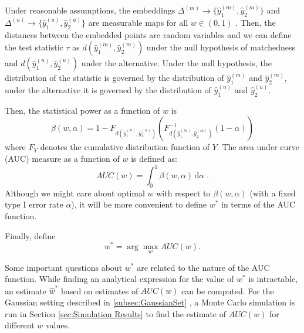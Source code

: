 \documentclass[12pt]{article} %
\begin{document}
 Under reasonable assumptions, the embeddings $\Delta^{(m)} \rightarrow  \{\hat{y}_{1}^{(m)},\hat{y}_{2}^{(m)}\!\}$  and $\Delta^{(u)}\rightarrow \{\hat{y}_{1}^{(u)} , \hat{y}_{2}^{(u)}\}$ are measurable maps for all $w \in (0,1)$ \cite{measurable_Niemiro1992}. Then, the distances between the embedded points are random variables and we can define the test statistic $\tau$ as $d(\hat{y}_{1}^{(m)},\hat{y}_{2}^{(m)})$ under the null hypothesis of matchedness and $d(\hat{y}_{1}^{(u)},\hat{y}_{2}^{(u)})$ under the alternative. Under the null hypothesis, the distribution of the statistic is governed by the distribution of $\hat{y}_{1}^{(m)}$ and $\hat{y}_{2}^{(m)}$, under the alternative it is governed by  the distribution of $\hat{y}_{1}^{(u)}$ and $\hat{y}_{2}^{(u)}$.

 Then, the statistical power as a function of $w$ is  \[\beta\left( w,\alpha\right)=1-F_{d \left(\hat{y}_{1}^{(u)},\hat{y}_{2}^{(u)}\right)}(F_{d\left(\hat{y}_{1}^{(m)},\hat{y}_{2}^{(m)}\right)}^{-1}(1-\alpha))\] where $F_Y$ denotes  the   cumulative distribution function of  $Y$.
The area under curve (AUC) measure  as a function of $w$ is defined as:  
\begin{equation} 
AUC(w)=\int_{0}^{1}\! \beta\left( w,\alpha\right)\,\mathrm{d}\alpha \; . \label{AUC_def}
\end{equation} 
Although we might care about optimal $w$ with respect to  $\beta\left( w,\alpha\right)$ (with a fixed type I error rate $\alpha$),  it will be more convenient to define $w^*$ in terms of the AUC function.

 Finally, define $$w^{*}=\arg\max_w{AUC\left( w\right)}. $$

 Some important questions about $w^*$ are  related to the nature of the AUC function.
While finding an analytical expression for the value of $w^*$ is intractable, an estimate $\hat{w}^*$  based on  estimates of $AUC(w)$ %
 can be computed.  For the Gaussian setting described in \ref{subsec:GaussianSet} , a Monte Carlo simulation is run in  Section  \ref{sec:Simulation Results} to find the estimate of $AUC(w)$ for different $w$ values.
\end{document}
